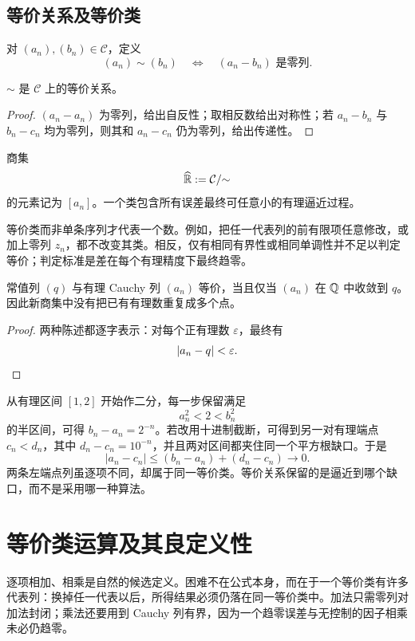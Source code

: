 \subsection{等价关系及等价类}


对 \((a_n),(b_n)\in\mathcal C\)，定义
\[
 (a_n)\sim(b_n)\quad\Longleftrightarrow\quad(a_n-b_n)\text{ 是零列}.
\]

\begin{proposition}
\(\sim\) 是 \(\mathcal C\) 上的等价关系。
\end{proposition}

\begin{proof}
\((a_n-a_n)\) 为零列，给出自反性；取相反数给出对称性；若 \(a_n-b_n\) 与 \(b_n-c_n\) 均为零列，则其和 \(a_n-c_n\) 仍为零列，给出传递性。
\end{proof}

商集
\[
 \widehat{\mathbb{R}}:=\mathcal C/{\sim}
\]
的元素记为 \([a_n]\)。一个类包含所有误差最终可任意小的有理逼近过程。

等价类而非单条序列才代表一个数。例如，把任一代表列的前有限项任意修改，或加上零列 \(z_n\)，都不改变其类。相反，仅有相同有界性或相同单调性并不足以判定等价；判定标准是差在每个有理精度下最终趋零。

\begin{proposition}
常值列 \((q)\) 与有理 Cauchy 列 \((a_n)\) 等价，当且仅当 \((a_n)\) 在 \(\mathbb{Q}\) 中收敛到 \(q\)。因此新商集中没有把已有有理数重复成多个点。
\end{proposition}

\begin{proof}
两种陈述都逐字表示：对每个正有理数 \(\varepsilon\)，最终有
\[
 \left|a_n-q\right|<\varepsilon.
\]
\end{proof}

\begin{example}[同一有理缺口的不同逼近]
从有理区间 \([1,2]\) 开始作二分，每一步保留满足
\[
 a_n^2<2<b_n^2
\]
的半区间，可得 \(b_n-a_n=2^{-n}\)。若改用十进制截断，可得到另一对有理端点 \(c_n<d_n\)，其中 \(d_n-c_n=10^{-n}\)，并且两对区间都夹住同一个平方根缺口。于是
\[
 |a_n-c_n|\le (b_n-a_n)+(d_n-c_n)\longrightarrow0.
\]
两条左端点列虽逐项不同，却属于同一等价类。等价关系保留的是逼近到哪个缺口，而不是采用哪一种算法。
\end{example}

\section{等价类运算及其良定义性}

逐项相加、相乘是自然的候选定义。困难不在公式本身，而在于一个等价类有许多代表列：换掉任一代表以后，所得结果必须仍落在同一等价类中。加法只需零列对加法封闭；乘法还要用到 Cauchy 列有界，因为一个趋零误差与无控制的因子相乘未必仍趋零。


